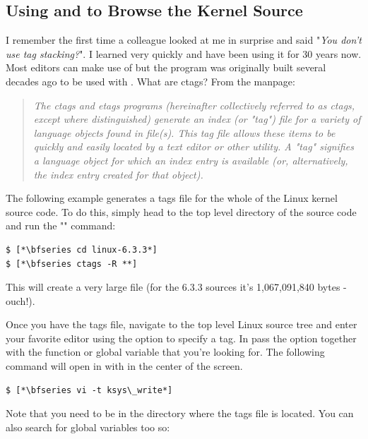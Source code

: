 \subsection{Using  and  to Browse the Kernel Source}

I remember the first time a colleague looked at me in surprise and said "\textit{You don't use tag stacking?}". I learned very quickly and have been using it for 30 years now. Most editors can make use of  but the program was originally built several decades ago to be used with .  What are ctags? From the manpage:

\begin{quote}
\textit{The ctags and etags programs (hereinafter collectively referred to as
       ctags, except where distinguished) generate an index (or "tag") file for
       a variety of language objects found in file(s).  This tag file allows
       these items to be quickly and easily located by a text editor or other
       utility. A "tag" signifies a language object for which an index entry is
       available (or, alternatively, the index entry created for that object).}
\end{quote}

\noindent
The following example generates a tags file for the whole of the Linux kernel source code. To do this, simply head to the top level directory of the source code and run the "" command:

\begin{lstlisting}
$ [*\bfseries cd linux-6.3.3*]
$ [*\bfseries ctags -R **]
\end{lstlisting}

\noindent
This will create a very large file (for the 6.3.3 sources it's 1,067,091,840 bytes - ouch!).

Once you have the tags file, navigate to the top level Linux source tree and enter your favorite editor using the option to specify a tag. In  pass the  option together with the function or global variable that you're looking for. The following command will open  in  with  in the center of the screen.

\begin{lstlisting}
$ [*\bfseries vi -t ksys\_write*]
\end{lstlisting}

\noindent
Note that you need to be in the directory where the tags file is located. You can also search for global variables too so:

